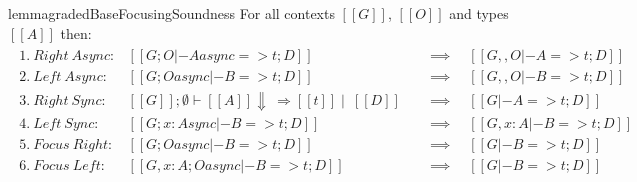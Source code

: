 
%

\begin{restatable}{lemma}{gradedBaseFocusingSoundness}
For all contexts $[[ G ]]$, $[[ O ]]$ and types $[[ A ]]$
then:
\begin{align*}
\begin{array}{lll}
 1.\ Right\ Async: & [[ G ; O |- A async => t ; D ]] \quad &\implies \quad [[ G ,, O |- A => t ; D ]]\\
 2.\ Left\ Async: & [[ G ; O async |- B => t ; D ]] \quad &\implies \quad [[ G ,, O |- B => t ; D ]]\\
 3.\ Right\ Sync: & [[ G ]] ; \emptyset \vdash [[ A ]] \Downarrow\ \Rightarrow [[ t ]] \mid\  [[ D ]] \quad &\implies \quad [[ G |- A => t ; D ]]\\
 4.\ Left\ Sync: & [[ G ; {x : A }sync |- B => t ; D ]] \quad &\implies \quad [[ G, x : A |- B => t ; D ]]\\
 5.\ Focus\ Right: & [[ G ; O async |- B => t ; D ]] \quad &\implies \quad [[ G |- B => t ; D ]]\\
 6.\ Focus\ Left: & [[ G, x : A ; O async |- B => t ; D ]] \quad &\implies \quad [[ G |- B => t ; D ]]
\end{array}
\end{align*}
\end{restatable}
